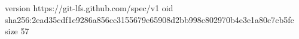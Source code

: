 version https://git-lfs.github.com/spec/v1
oid sha256:2ead35cdf1e9286a856cc3155679e65908d2bb998c802970b4e3e1a80c7cb5fc
size 57

